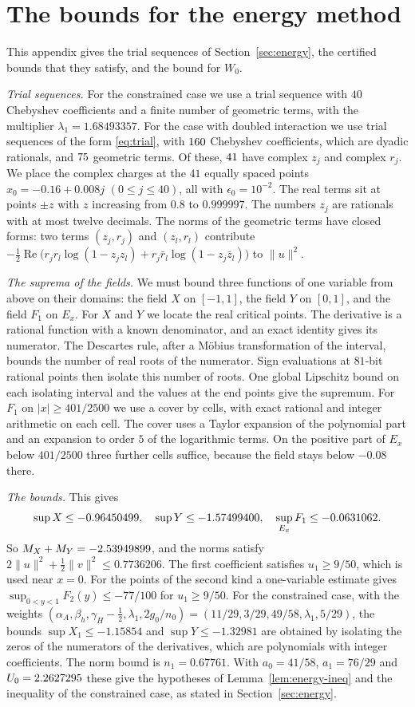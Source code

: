 \section{The bounds for the energy method}\label{app:field}

This appendix gives the trial sequences of Section~\ref{sec:energy}, the certified bounds that they satisfy, and
the bound for $W_0$.

\emph{Trial sequences.} For the constrained case we use a trial sequence with $40$ Chebyshev coefficients and a
finite number of geometric terms, with the multiplier $\lambda_1=1.68493357$. For the case with doubled
interaction we use trial sequences of the form \eqref{eq:trial}, with $160$ Chebyshev coefficients, which are
dyadic rationals, and $75$ geometric terms. Of these, $41$ have complex $z_j$ and complex $r_j$. We
place the complex charges at the $41$ equally spaced points $x_0=-0.16+0.008j$ $(0\le j\le40)$, all with
$\epsilon_0=10^{-2}$. The real terms sit at points $\pm z$ with $z$ increasing from $0.8$ to $0.999997$. The
numbers $z_j$ are rationals with at most twelve decimals. The norms of the geometric terms have closed forms:
two terms $(z_j,r_j)$ and $(z_l,r_l)$ contribute
$-\frac12\operatorname{Re}\bigl(r_jr_l\log(1-z_jz_l)+r_j\bar r_l\log(1-z_j\bar z_l)\bigr)$ to $\|u\|^2$.

\emph{The suprema of the fields.} We must bound three functions of one variable from above on their domains: the
field $X$ on $[-1,1]$, the field $Y$ on $[0,1]$, and the field $F_1$ on $E_x$. For $X$ and $Y$ we locate the real
critical points. The derivative is a rational function with a known denominator, and an exact identity gives its
numerator. The Descartes rule, after a M\"obius transformation of the interval, bounds the number of real roots
of the numerator. Sign evaluations at $81$-bit rational points then isolate this number of roots. One global Lipschitz
bound on each isolating interval and the values at the end points give the supremum. For $F_1$ on $|x|\ge401/2500$ we use a
cover by cells, with exact rational and integer arithmetic on each cell. The cover uses a Taylor expansion of the
polynomial part and an expansion to order $5$ of the logarithmic terms. On the positive part of $E_x$ below $401/2500$
three further cells suffice, because the field stays below $-0.08$ there.

\emph{The bounds.} This gives
\[
 \sup X\le-0.96450499,\quad \sup Y\le-1.57499400,\quad \sup_{E_x}F_1\le-0.0631062 .
\]
So $M_X+M_Y=-2.53949899$, and the norms satisfy $2\|u\|^2+\frac12\|v\|^2\le0.7736206$. The first coefficient satisfies
$u_1\ge9/50$, which is used near $x=0$. For the points of the second kind a one-variable estimate gives
$\sup_{0<y<1}F_2(y)\le-77/100$ for $u_1\ge9/50$. For the constrained case, with the weights
$(\alpha_A,\beta_h,\gamma_H-\frac12,\lambda_1,2g_0/n_0)=(11/29,3/29,49/58,\lambda_1,5/29)$, the bounds
$\sup X_1\le-1.15854$ and $\sup Y\le-1.32981$ are obtained by isolating the zeros of the numerators of the
derivatives, which are polynomials with integer coefficients. The norm bound is $n_1=0.67761$. With $a_0=41/58$,
$a_1=76/29$ and $U_0=2.2627295$ these give the hypotheses of Lemma~\ref{lem:energy-ineq} and the inequality of the
constrained case, as stated in Section~\ref{sec:energy}.

